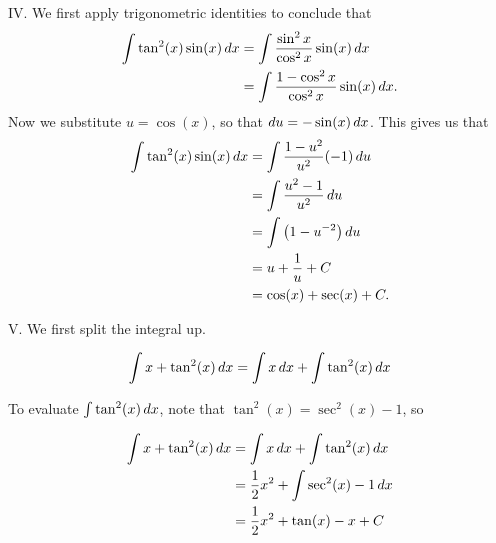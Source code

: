 \documentclass[noauthor]{ximera}
\begin{document}
\begin{freeResponse}
		
IV. We first apply trigonometric identities to conclude that
		\begin{align*}
		\int \tan^2(x) \sin (x) \mathop{}\!d x
		&= \int \frac{\sin^2 x}{\cos^2 x} \sin (x) \mathop{}\!d x  \\
		&= \int \frac{1-\cos^2 x}{\cos^2 x} \sin (x) \mathop{}\!d x.
		\end{align*}
	Now we substitute $u = \cos (x) $, so that $\mathop{}\!d u = - \sin (x) \mathop{}\!d x$. This gives us that
		\begin{align*}
		\int \tan^2(x) \sin (x) \mathop{}\!d x &= \int \frac{1-u^2}{u^2} (-1) \mathop{}\!d u  \\
		&= \int \frac{u^2 - 1}{u^2} \mathop{}\!d u  \\
		&= \int \left( 1 - u^{-2} \right) \mathop{}\!d u  \\
		&= u + \frac{1}{u} + C  \\
		&= \cos (x) + \sec (x) + C.
		\end{align*}
		
V. We first split the integral up.

\[ \int x+ \tan^2(x) \mathop{}\!d x = \int x \mathop{}\!d x +\int  \tan^2(x) \mathop{}\!d x\]

To evaluate $\int \tan^2(x) \mathop{}\!d x$, note that $\tan^2(x) = \sec^2(x)-1$, so

\begin{align*}
\int x+ \tan^2(x) \mathop{}\!d x &= \int x \mathop{}\!d x +\int  \tan^2(x) \mathop{}\!d x \\
&= \frac{1}{2}x^2 +\int  \sec^2(x) -1 \mathop{}\!d x \\
&=  \frac{1}{2}x^2 + \tan(x) -x+C \\
\end{align*}
\end{freeResponse}
\end{document}
